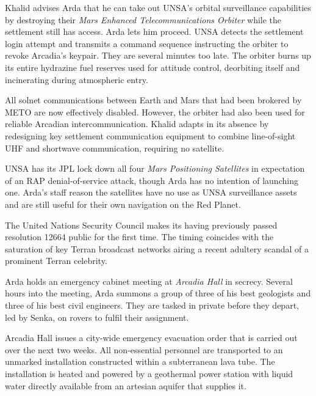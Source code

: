 Khalid advises Arda that he can take out UNSA's orbital surveillance capabilities by destroying their {\it Mars Enhanced Telecommunications Orbiter} while the settlement still has access. Arda lets him proceed. UNSA detects the settlement login attempt and transmits a command sequence instructing the orbiter to revoke Arcadia's keypair. They are several minutes too late. The orbiter burns up its entire hydrazine fuel reserves used for attitude control, deorbiting itself and incinerating during atmospheric entry.

All solnet communications between Earth and Mars that had been brokered by METO are now effectively disabled. However, the orbiter had also been used for reliable Arcadian intercommunication. Khalid adapts in its absence by redesigning key settlement communication equipment to combine line-of-sight UHF and shortwave communication, requiring no satellite.

UNSA has its JPL lock down all four {\it Mars Positioning Satellites} in expectation of an RAP denial-of-service attack, though Arda has no intention of launching one. Arda's staff reason the satellites have no use as UNSA surveillance assets and are still useful for their own navigation on the Red Planet.
\StopTimelineDate

The United Nations Security Council makes its having previously passed resolution 12664 public for the first time. The timing coincides with the saturation of key Terran broadcast networks airing a recent adultery scandal of a prominent Terran celebrity.
\StopTimelineDate

Arda holds an emergency cabinet meeting at {\it Arcadia Hall} in secrecy. Several hours into the meeting, Arda summons a group of three of his best geologists and three of his best civil engineers. They are tasked in private before they depart, led by Senka, on rovers to fulfil their assignment.
\StopTimelineDate

Arcadia Hall issues a city-wide emergency evacuation order that is carried out over the next two weeks. All non-essential personnel are transported to an unmarked installation constructed within a subterranean lava tube. The installation is heated and powered by a geothermal power station with liquid water directly available from an artesian aquifer that supplies it.
\StopTimelineDate

